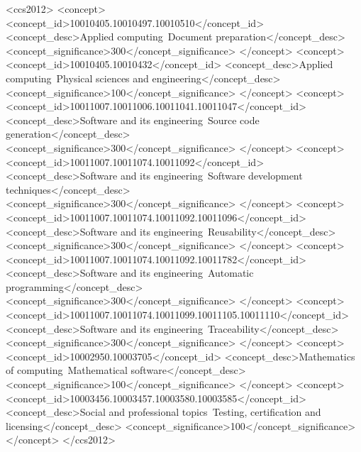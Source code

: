 \documentclass[sigconf]{acmart}
\begin{document}
\begin{CCSXML}
<ccs2012>
<concept>
<concept_id>10010405.10010497.10010510</concept_id>
<concept_desc>Applied computing~Document preparation</concept_desc>
<concept_significance>300</concept_significance>
</concept>
<concept>
<concept_id>10010405.10010432</concept_id>
<concept_desc>Applied computing~Physical sciences and engineering</concept_desc>
<concept_significance>100</concept_significance>
</concept>
<concept>
<concept_id>10011007.10011006.10011041.10011047</concept_id>
<concept_desc>Software and its engineering~Source code generation</concept_desc>
<concept_significance>300</concept_significance>
</concept>
<concept>
<concept_id>10011007.10011074.10011092</concept_id>
<concept_desc>Software and its engineering~Software development techniques</concept_desc>
<concept_significance>300</concept_significance>
</concept>
<concept>
<concept_id>10011007.10011074.10011092.10011096</concept_id>
<concept_desc>Software and its engineering~Reusability</concept_desc>
<concept_significance>300</concept_significance>
</concept>
<concept>
<concept_id>10011007.10011074.10011092.10011782</concept_id>
<concept_desc>Software and its engineering~Automatic programming</concept_desc>
<concept_significance>300</concept_significance>
</concept>
<concept>
<concept_id>10011007.10011074.10011099.10011105.10011110</concept_id>
<concept_desc>Software and its engineering~Traceability</concept_desc>
<concept_significance>300</concept_significance>
</concept>
<concept>
<concept_id>10002950.10003705</concept_id>
<concept_desc>Mathematics of computing~Mathematical software</concept_desc>
<concept_significance>100</concept_significance>
</concept>
<concept>
<concept_id>10003456.10003457.10003580.10003585</concept_id>
<concept_desc>Social and professional topics~Testing, certification and licensing</concept_desc>
<concept_significance>100</concept_significance>
</concept>
</ccs2012>
\end{CCSXML}

\end{document}
